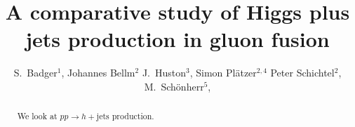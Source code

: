 \documentclass[11pt]{cernrep}
\begin{document}
\title{A comparative study of Higgs plus jets production in gluon fusion}

\author{
  S.\ Badger$^1$,
  Johannes Bellm$^2$
  J.\ Huston$^3$,
  Simon Plätzer$^{2,4}$
  Peter Schichtel$^2$,
  M.\ Sch\"onherr$^5$,
}

\maketitle

\begin{abstract}
  We look at $pp\to h + \text{jets}$ production.
\end{abstract}






\end{document}
